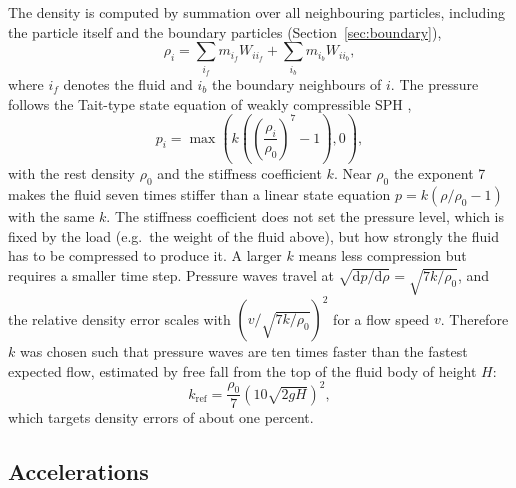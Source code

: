 The density is computed by summation over all neighbouring particles, including the
particle itself and the boundary particles (Section~\ref{sec:boundary}),
\begin{equation}
    \rho_i = \sum_{i_f} m_{i_f} W_{i i_f} + \sum_{i_b} m_{i_b} W_{i i_b},
\end{equation}
where $i_f$ denotes the fluid and $i_b$ the boundary neighbours of $i$. The
pressure follows the Tait-type state equation of weakly compressible SPH
\cite{becker2007},
\begin{equation}
    p_i = \max\left(k\left(\left(\frac{\rho_i}{\rho_0}\right)^7 - 1\right), 0\right),
    \label{eq:state}
\end{equation}
with the rest density $\rho_0$ and the stiffness coefficient $k$. Near $\rho_0$
the exponent 7 makes the fluid seven times stiffer than a linear state equation
$p = k(\rho/\rho_0 - 1)$ with the same $k$. The stiffness coefficient does not
set the pressure level, which is fixed by the load (e.g.\ the weight of the
fluid above), but how strongly the fluid has to be compressed to produce it. A
larger $k$ means less compression but requires a smaller time step. Pressure
waves travel at $\sqrt{\mathrm{d}p/\mathrm{d}\rho} = \sqrt{7k/\rho_0}$, and the
relative density error scales with $(v/\sqrt{7k/\rho_0})^2$ for a flow speed $v$.
Therefore $k$ was chosen such that pressure waves are ten times faster than the
fastest expected flow, estimated by free fall from the top of the fluid body of
height $H$:
\begin{equation}
    k_\mathrm{ref} = \frac{\rho_0}{7}\left(10\sqrt{2gH}\right)^2,
\end{equation}
which targets density errors of about one percent.

\subsection{Accelerations}
\label{sec:accelerations}

